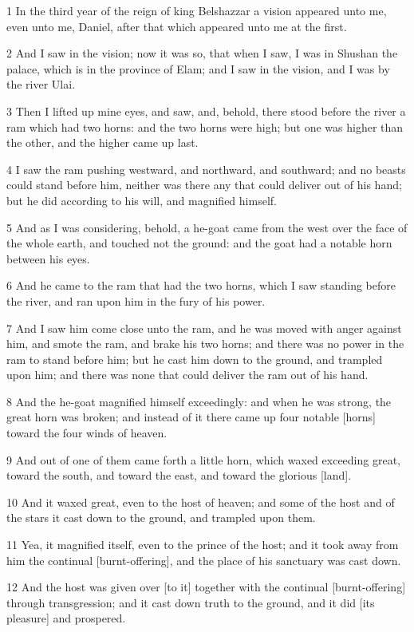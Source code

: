 \par 1 In the third year of the reign of king Belshazzar a vision appeared unto me, even unto me, Daniel, after that which appeared unto me at the first.
\par 2 And I saw in the vision; now it was so, that when I saw, I was in Shushan the palace, which is in the province of Elam; and I saw in the vision, and I was by the river Ulai.
\par 3 Then I lifted up mine eyes, and saw, and, behold, there stood before the river a ram which had two horns: and the two horns were high; but one was higher than the other, and the higher came up last.
\par 4 I saw the ram pushing westward, and northward, and southward; and no beasts could stand before him, neither was there any that could deliver out of his hand; but he did according to his will, and magnified himself.
\par 5 And as I was considering, behold, a he-goat came from the west over the face of the whole earth, and touched not the ground: and the goat had a notable horn between his eyes.
\par 6 And he came to the ram that had the two horns, which I saw standing before the river, and ran upon him in the fury of his power.
\par 7 And I saw him come close unto the ram, and he was moved with anger against him, and smote the ram, and brake his two horns; and there was no power in the ram to stand before him; but he cast him down to the ground, and trampled upon him; and there was none that could deliver the ram out of his hand.
\par 8 And the he-goat magnified himself exceedingly: and when he was strong, the great horn was broken; and instead of it there came up four notable [horns] toward the four winds of heaven.
\par 9 And out of one of them came forth a little horn, which waxed exceeding great, toward the south, and toward the east, and toward the glorious [land].
\par 10 And it waxed great, even to the host of heaven; and some of the host and of the stars it cast down to the ground, and trampled upon them.
\par 11 Yea, it magnified itself, even to the prince of the host; and it took away from him the continual [burnt-offering], and the place of his sanctuary was cast down.
\par 12 And the host was given over [to it] together with the continual [burnt-offering] through transgression; and it cast down truth to the ground, and it did [its pleasure] and prospered.
